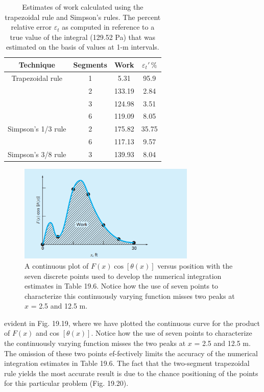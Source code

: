 \documentclass[../main.tex]{subfiles}
\begin{document}
\begin{table}[htb!]
\centering
\caption{Estimates of work calculated using the trapezoidal rule and
Simpson's rules. The percent relative error $\varepsilon_t$ as computed in
reference to a true value of the integral (129.52 Pa) that was
estimated on the basis of values at 1-m intervals.}
\def\arraystretch{1.2}
\setlength{\tabcolsep}{36pt}
\begin{tabular}{cccc}
	\hline
	\textbf{Technique} & \textbf{Segments} &  \textbf{Work} & $\varepsilon_t' \,\%$\\ \hline
	Trapezoidal rule & 1 & 5.31 & 95.9\\
	 & 2 & 133.19 & 2.84\\
	 & 3 & 124.98 & 3.51\\
	 & 6 & 119.09 & 8.05\\
	Simpson's 1/3 rule & 2 & 175.82 & 35.75\\
	 & 6 & 117.13 & 9.57\\
	Simpson's 3/8 rule & 3 & 139.93 & 8.04\\ \hline
\end{tabular}
\end{table}

\vspace{0.5 in}

\begin{figure}[hbt!]
	\centering
	\includegraphics[width=0.75\textwidth]{pic.003}
	\caption{\textsf{A continuous plot of $F(x) \cos [\theta(x)]$ versus position with the seven discrete points used to develop
the numerical integration estimates in Table 19.6. Notice how the use of seven points to
characterize this continuously varying function misses two peaks at $x$ = 2.5 and 12.5 m.}} 
	\label{pic.003}
\end{figure}

\vspace{0.2in}

evident in Fig. 19.19, where we have plotted the continuous curve for the product of $F(x)$
and cos $[\theta(x)]$. Notice how the use of seven points to characterize the continuously varying
function misses the two peaks at $x$ = 2.5 and 12.5 m. The omission of these two points ef-fectively limits the accuracy of the numerical integration estimates in Table 19.6. The fact
that the two-segment trapezoidal rule yields the most accurate result is due to the chance
positioning of the points for this particular problem (Fig. 19.20).
\end{document}
